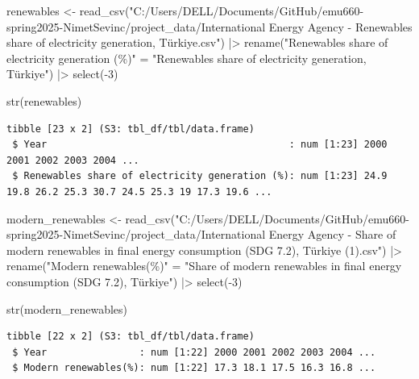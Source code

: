 \documentclass[
  letterpaper,
  DIV=11,
  numbers=noendperiod]{scrartcl}
\newenvironment{Shaded}{\begin{snugshade}}{\end{snugshade}}
\newcommand{\DecValTok}[1]{\textcolor[rgb]{0.68,0.00,0.00}{#1}}
\newcommand{\FunctionTok}[1]{\textcolor[rgb]{0.28,0.35,0.67}{#1}}
\newcommand{\NormalTok}[1]{\textcolor[rgb]{0.00,0.23,0.31}{#1}}
\newcommand{\OtherTok}[1]{\textcolor[rgb]{0.00,0.23,0.31}{#1}}
\newcommand{\SpecialCharTok}[1]{\textcolor[rgb]{0.37,0.37,0.37}{#1}}
\newcommand{\StringTok}[1]{\textcolor[rgb]{0.13,0.47,0.30}{#1}}
\begin{document}
\begin{Shaded}
\begin{Highlighting}[]
\NormalTok{renewables }\OtherTok{\textless{}{-}} \FunctionTok{read\_csv}\NormalTok{(}\StringTok{"C:/Users/DELL/Documents/GitHub/emu660{-}spring2025{-}NimetSevinc/project\_data/International Energy Agency {-} Renewables share of electricity generation, Türkiye.csv"}\NormalTok{) }\SpecialCharTok{|\textgreater{}} \FunctionTok{rename}\NormalTok{(}\StringTok{"Renewables share of electricity generation (\%)"} \OtherTok{=} \StringTok{"Renewables share of electricity generation, Türkiye"}\NormalTok{) }\SpecialCharTok{|\textgreater{}} \FunctionTok{select}\NormalTok{(}\SpecialCharTok{{-}}\DecValTok{3}\NormalTok{)}

\FunctionTok{str}\NormalTok{(renewables)}
\end{Highlighting}
\end{Shaded}

\begin{verbatim}
tibble [23 x 2] (S3: tbl_df/tbl/data.frame)
 $ Year                                          : num [1:23] 2000 2001 2002 2003 2004 ...
 $ Renewables share of electricity generation (%): num [1:23] 24.9 19.8 26.2 25.3 30.7 24.5 25.3 19 17.3 19.6 ...
\end{verbatim}

\begin{Shaded}
\begin{Highlighting}[]
\NormalTok{modern\_renewables }\OtherTok{\textless{}{-}} \FunctionTok{read\_csv}\NormalTok{(}\StringTok{"C:/Users/DELL/Documents/GitHub/emu660{-}spring2025{-}NimetSevinc/project\_data/International Energy Agency {-} Share of modern renewables in final energy consumption (SDG 7.2), Türkiye (1).csv"}\NormalTok{) }\SpecialCharTok{|\textgreater{}} \FunctionTok{rename}\NormalTok{(}\StringTok{"Modern renewables(\%)"} \OtherTok{=} \StringTok{"Share of modern renewables in final energy consumption (SDG 7.2), Türkiye"}\NormalTok{) }\SpecialCharTok{|\textgreater{}} \FunctionTok{select}\NormalTok{(}\SpecialCharTok{{-}}\DecValTok{3}\NormalTok{)}


\FunctionTok{str}\NormalTok{(modern\_renewables)}
\end{Highlighting}
\end{Shaded}

\begin{verbatim}
tibble [22 x 2] (S3: tbl_df/tbl/data.frame)
 $ Year                : num [1:22] 2000 2001 2002 2003 2004 ...
 $ Modern renewables(%): num [1:22] 17.3 18.1 17.5 16.3 16.8 ...
\end{verbatim}
\end{document}
